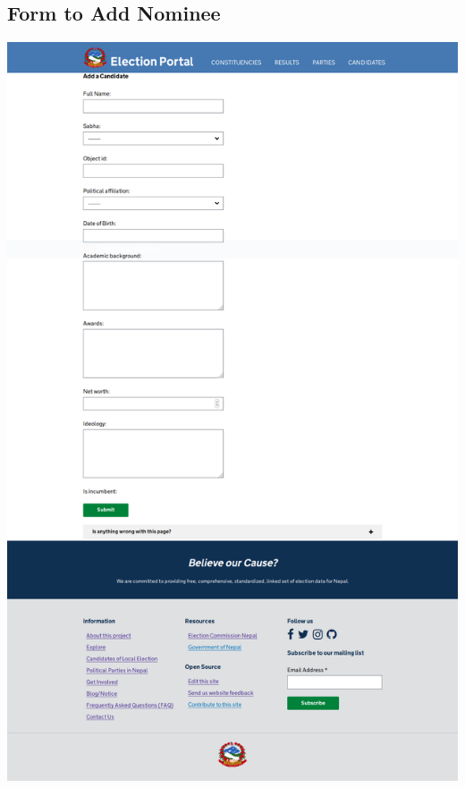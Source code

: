 \documentclass[12pt]{article}
\begin{document}
\subsection{Form to Add Nominee}
\begin{center}
\includegraphics[scale=0.25]{Form_To_Add_Candidate.png}
\end{center}
\end{document}
